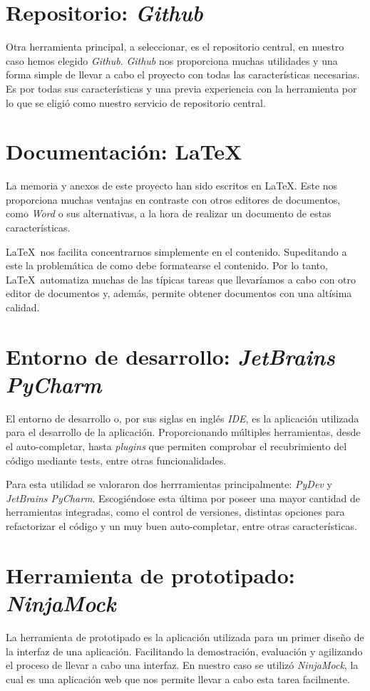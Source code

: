 
\section{Repositorio: \textit{Github}}

Otra herramienta principal, a seleccionar, es el repositorio central, en nuestro caso hemos elegido \textit{Github}. \textit{Github} nos proporciona muchas utilidades y una forma simple de llevar a cabo el proyecto con todas las características necesarias. Es por todas sus características y una previa experiencia con la herramienta por lo que se eligió como nuestro servicio de repositorio central.

\section{Documentación: \LaTeX}

La memoria y anexos de este proyecto han sido escritos en \LaTeX. Este nos proporciona muchas ventajas en contraste con otros editores de documentos, como \textit{Word} o sus alternativas, a la hora de realizar un documento de estas características.

\LaTeX\ nos facilita concentrarnos simplemente en el contenido. Supeditando a este la problemática de como debe formatearse el contenido. Por lo tanto, \LaTeX\ automatiza muchas de las típicas tareas que llevaríamos a cabo con otro editor de documentos y, además, permite obtener documentos con una altísima calidad.

\section{Entorno de desarrollo: \textit{JetBrains PyCharm}}

El entorno de desarrollo o, por sus siglas en inglés \textit{IDE}, es la aplicación utilizada para el desarrollo de la aplicación. Proporcionando múltiples herramientas, desde el auto-completar, hasta \textit{plugins} que permiten comprobar el recubrimiento del código mediante tests, entre otras funcionalidades.

Para esta utilidad se valoraron dos herrramientas principalmente: \textit{PyDev} y \textit{JetBrains PyCharm}. Escogiéndose esta última por poseer una mayor cantidad de herramientas integradas, como el control de versiones, distintas opciones para refactorizar el código y un muy buen auto-completar, entre otras características.

\section{Herramienta de prototipado: \textit{NinjaMock}}

La herramienta de prototipado es la aplicación utilizada para un primer diseño de la interfaz de una aplicación. Facilitando la demostración, evaluación y agilizando el proceso de llevar a cabo una interfaz. En nuestro caso se utilizó \textit{NinjaMock}, la cual es una aplicación web que nos permite llevar a cabo esta tarea facilmente.
